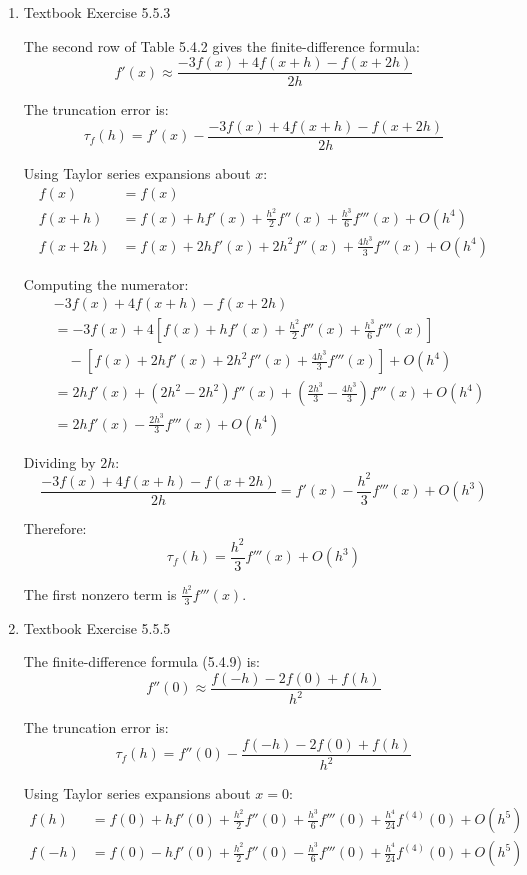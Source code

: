 \documentclass[reqno, answers]{exam}
\begin{document}
\begin{enumerate}
\begin{solution}
The first two nonzero terms are $-\frac{h^2}{6}f'''(x)$ and $-\frac{h^4}{120}f^{(5)}(x)$.
\end{solution}

\item Textbook Exercise 5.5.3
\begin{solution}
The second row of Table 5.4.2 gives the finite-difference formula:
$$f'(x) \approx \frac{-3f(x) + 4f(x+h) - f(x+2h)}{2h}$$

The truncation error is:
$$\tau_f(h) = f'(x) - \frac{-3f(x) + 4f(x+h) - f(x+2h)}{2h}$$

Using Taylor series expansions about $x$:
\begin{align*}
f(x) &= f(x)\\
f(x+h) &= f(x) + hf'(x) + \frac{h^2}{2}f''(x) + \frac{h^3}{6}f'''(x) + O(h^4)\\
f(x+2h) &= f(x) + 2hf'(x) + 2h^2f''(x) + \frac{4h^3}{3}f'''(x) + O(h^4)
\end{align*}

Computing the numerator:
\begin{align*}
&-3f(x) + 4f(x+h) - f(x+2h)\\
&= -3f(x) + 4\left[f(x) + hf'(x) + \frac{h^2}{2}f''(x) + \frac{h^3}{6}f'''(x)\right]\\
&\quad - \left[f(x) + 2hf'(x) + 2h^2f''(x) + \frac{4h^3}{3}f'''(x)\right] + O(h^4)\\
&= 2hf'(x) + (2h^2 - 2h^2)f''(x) + \left(\frac{2h^3}{3} - \frac{4h^3}{3}\right)f'''(x) + O(h^4)\\
&= 2hf'(x) - \frac{2h^3}{3}f'''(x) + O(h^4)
\end{align*}

Dividing by $2h$:
$$\frac{-3f(x) + 4f(x+h) - f(x+2h)}{2h} = f'(x) - \frac{h^2}{3}f'''(x) + O(h^3)$$

Therefore:
$$\boxed{\tau_f(h) = \frac{h^2}{3}f'''(x) + O(h^3)}$$

The first nonzero term is $\frac{h^2}{3}f'''(x)$.
\end{solution}

\item Textbook Exercise 5.5.5

\begin{solution}
The finite-difference formula (5.4.9) is:
$$f''(0) \approx \frac{f(-h) - 2f(0) + f(h)}{h^2}$$

The truncation error is:
$$\tau_f(h) = f''(0) - \frac{f(-h) - 2f(0) + f(h)}{h^2}$$

Using Taylor series expansions about $x = 0$:
\begin{align*}
f(h) &= f(0) + hf'(0) + \frac{h^2}{2}f''(0) + \frac{h^3}{6}f'''(0) + \frac{h^4}{24}f^{(4)}(0) + O(h^5)\\
f(-h) &= f(0) - hf'(0) + \frac{h^2}{2}f''(0) - \frac{h^3}{6}f'''(0) + \frac{h^4}{24}f^{(4)}(0) + O(h^5)
\end{align*}


\end{solution}
\end{enumerate}
\end{document}
